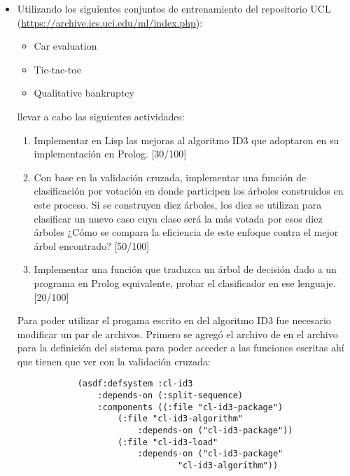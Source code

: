 \begin{itemize}
    \item Utilizando los siguientes conjuntos de entrenamiento del repositorio UCL (\url{https://archive.ics.uci.edu/ml/index.php}):
    \begin{itemize}
        \item Car evaluation
        \item Tic-tac-toe
        \item Qualitative bankruptcy
    \end{itemize}
    llevar a cabo las siguientes actividades:
    \begin{enumerate}
        \item Implementar en Lisp las mejoras al algoritmo ID3 que adoptaron en su implementación en Prolog. [30/100]
        \item Con base en la validación cruzada, implementar una función de clasificación por votación en donde participen los árboles construidos en este proceso. Si se construyen diez árboles, los diez se utilizan para clasificar un nuevo caso cuya clase será la más votada por esos diez árboles ¿Cómo se compara la eficiencia de este enfoque contra el mejor árbol encontrado? [50/100]
        \item Implementar una función que traduzca un árbol de decisión dado a un programa en Prolog equivalente, probar el clasificador en ese lenguaje. [20/100]
    \end{enumerate}
    \begin{solution}
        Para poder utilizar el progama escrito en  del algoritmo ID3 fue necesario modificar un par de archivos. Primero se agregó el archivo de  en el archivo para la definición del sistema  para poder acceder a las funciones escritas ahí que tienen que ver con la validación cruzada:
        \begin{verbatim}
            (asdf:defsystem :cl-id3
                :depends-on (:split-sequence)
                :components ((:file "cl-id3-package")
                    (:file "cl-id3-algorithm"
                        :depends-on ("cl-id3-package"))
                    (:file "cl-id3-load"
                        :depends-on ("cl-id3-package" 
                                "cl-id3-algorithm"))

\end{verbatim}
\end{solution}
\end{itemize}
